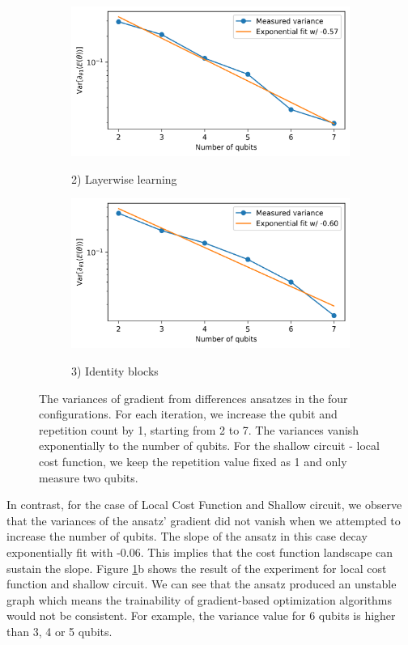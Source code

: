 \begin{figure}
    \begin{subfigure}[b]{.49\linewidth}
        \includegraphics[width=\linewidth]{Artefact/Appendices/var2.png}
        \centerline{2) Layerwise learning}
    \end{subfigure}
    \hfill
    \begin{subfigure}[b]{.49\linewidth}
        \includegraphics[width=\linewidth]{Artefact/Appendices/var3.png}
        \centerline{3) Identity blocks}
    \end{subfigure}

    \caption{
        The variances of gradient from differences ansatzes in the four configurations.
        For each iteration, we increase the qubit and repetition count by 1, starting from 2 to 7.
        The variances vanish exponentially to the number of qubits.
        For the shallow circuit - local cost function, we keep the repetition value fixed as 1 and only measure two qubits.
    }
    \label{Plot ansatzes variance}
\end{figure}

In contrast, for the case of Local Cost Function and Shallow circuit, we observe that the variances of the ansatz' gradient did not vanish when we attempted to increase the number of qubits.
The slope of the ansatz in this case decay exponentially fit with -0.06.
This implies that the cost function landscape can sustain the slope.
Figure \ref{Plot ansatzes variance}b shows the result of the experiment for local cost function and shallow circuit.
We can see that the ansatz produced an unstable graph which means the trainability of gradient-based optimization algorithms would not be consistent.
For example, the variance value for 6 qubits is higher than 3, 4 or 5 qubits.

